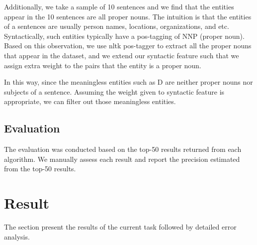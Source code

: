 \documentclass[12pt,a4paper]{article}
\begin{document}
Additionally, we take a sample of 10 sentences and we find that the entities appear in the 10 sentences are all proper nouns. The intuition is that the entities of a sentences are usually person names, locations, organizations, and etc. Syntactically, such entities typically have a pos-tagging of NNP (proper noun). Based on this observation, we use nltk pos-tagger \cite{nltk} to extract all the proper nouns that appear in the dataset, and we extend our syntactic feature such that we assign extra weight to the pairs that the entity is a proper noun. 

In this way, since the meaningless entities  such as D are neither proper nouns nor subjects of a sentence. Assuming the weight given to syntactic feature is appropriate, we can filter out those meaningless entities. 



\subsection{Evaluation}
The evaluation was conducted based on the top-50 results returned from each algorithm. We manually assess each result and report the precision estimated from the top-50 results.

\section{Result}
The section present the results of the current task followed by detailed error analysis.
\end{document}
